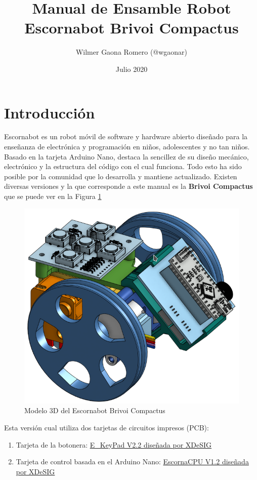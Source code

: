 \documentclass{article}
\title{Manual de Ensamble Robot Escornabot Brivoi Compactus}
\author{Wilmer Gaona Romero (@wgaonar)}
\date{Julio 2020}
\begin{document}
\maketitle

\section{Introducción}
Escornabot es un robot móvil de software y hardware abierto diseñado para la enseñanza de electrónica y programación en niños, adolescentes y no tan niños. Basado en la tarjeta Arduino Nano, destaca la sencillez de su diseño mecánico, electrónico y la estructura del código con el cual funciona. Todo esto ha sido posible por la comunidad que lo desarrolla y mantiene actualizado. Existen diversas versiones y la que corresponde a este manual es la \textbf{Brivoi Compactus} que se puede ver en la Figura \ref{fig:modelo3D}

\begin{figure}[H]
    \centering
    \includegraphics[width=0.6\columnwidth]{images/3DParts/portadaOnshape_1.png}
    \caption{Modelo 3D del Escornabot Brivoi Compactus}
    \label{fig:modelo3D}
\end{figure}

Esta versión cual utiliza dos tarjetas de circuitos impresos (PCB):

\begin{enumerate}
    \item Tarjeta de la botonera: \href{https://github.com/xdesig/escornabot-electronics/tree/master/Electronics/E_KEYPAD/E_KEYPAD_2.20}{E\_KeyPad V2.2 diseñada por XDeSIG}
    \item Tarjeta de control basada en el Arduino Nano:
    \href{https://github.com/xdesig/escornabot-electronics/tree/master/Electronics/EscornaCPU/1.x/1.20}{EscornaCPU V1.2 diseñada por XDeSIG}
\end{enumerate}
\end{document}
